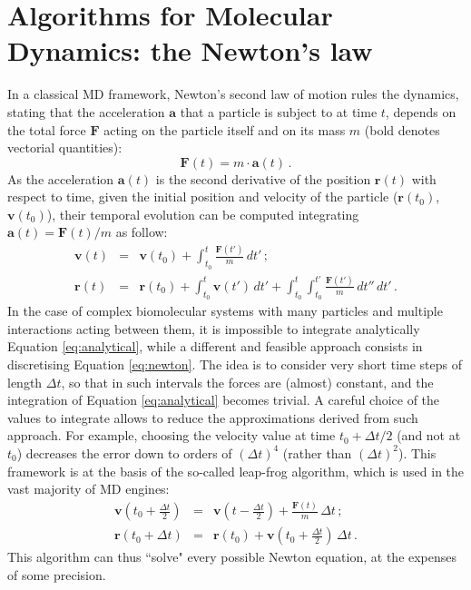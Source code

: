 \section{Algorithms for Molecular Dynamics: the Newton's law}
In a classical MD framework, Newton's second law of motion rules the dynamics, stating that the acceleration $\textbf{a}$ that a particle is subject to at time $t$, depends on the total force $\textbf{F}$ acting on the particle itself and on its mass $m$ (bold denotes vectorial quantities):
\begin{equation} \label{eq:newton}
\textbf{F}(t) =  m \cdot \textbf{a}(t) \, .
\end{equation}
As the acceleration $\textbf{a}(t)$ is the second derivative of the position $\textbf{r}(t)$ with respect to time, given the initial position and velocity of the particle ($\textbf{r}(t_0)$, $\textbf{v}(t_0)$), their temporal evolution can be computed integrating $\textbf{a}(t) = \textbf{F}(t)/m$ as follow:
\begin{eqnarray} \label{eq:analytical}
\mathbf{v}(t) &=& \mathbf{v}(t_0) + \int_{t_0}^t \frac{\mathbf{F}(t')}{m} \, dt' \, ; \\
\mathbf{r}(t) &=& \mathbf{r}(t_0) + \int_{t_0}^t \mathbf{v}(t') \, dt' + \int_{t_0}^t \int_{t_0}^{t'} \frac{\mathbf{F}(t')}{m} \, dt'' \, dt'\, .
\end{eqnarray}
In the case of complex biomolecular systems with many particles and multiple interactions acting between them, it is impossible to integrate analytically Equation \ref{eq:analytical}, while a different and feasible approach consists in discretising Equation \ref{eq:newton}.
%
The idea is to consider very short time steps of length $\Delta t$, so that in such intervals the forces are (almost) constant, and the integration of Equation \ref{eq:analytical} becomes trivial.
%
A careful choice of the values to integrate allows to reduce the approximations derived from such approach.
For example, choosing the velocity value at time $t_0 + \Delta t/2$ (and not at $t_0$) decreases the error down to orders of $(\Delta t)^4$ (rather than $(\Delta t)^2$). This framework is at the basis of the so-called leap-frog algorithm, which is used in the vast majority of MD engines:
\begin{eqnarray}
\mathbf{v}\left(t_0 + \frac{\Delta t}{2}\right) &=& \mathbf{v}\left(t - \frac{\Delta t}{2}\right) + \frac{\mathbf{F}(t)}{m} \, \Delta t \, ; \\
\mathbf{r}(t_0 + \Delta t) &=& \mathbf{r}(t_0) + \mathbf{v}\left(t_0 + \frac{\Delta t}{2}\right) \, \Delta t \, .
\end{eqnarray}
This algorithm can thus ``solve" every possible Newton equation, at the expenses of some precision.

